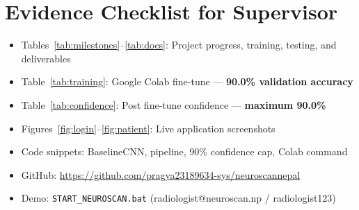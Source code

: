 \documentclass[11pt,a4paper]{article}
\begin{document}
\section*{Evidence Checklist for Supervisor}
\begin{itemize}[noitemsep]
  \item Tables~\ref{tab:milestones}--\ref{tab:docs}: Project progress, training, testing, and deliverables
  \item Table~\ref{tab:training}: Google Colab fine-tune --- \textbf{90.0\% validation accuracy}
  \item Table~\ref{tab:confidence}: Post fine-tune confidence --- \textbf{maximum 90.0\%}
  \item Figures~\ref{fig:login}--\ref{fig:patient}: Live application screenshots
  \item Code snippets: BaselineCNN, pipeline, 90\% confidence cap, Colab command
  \item GitHub: \url{https://github.com/pragya23189634-sys/neuroscannepal}
  \item Demo: \texttt{START\_NEUROSCAN.bat} (radiologist@neuroscan.np / radiologist123)
\end{itemize}
\end{document}
